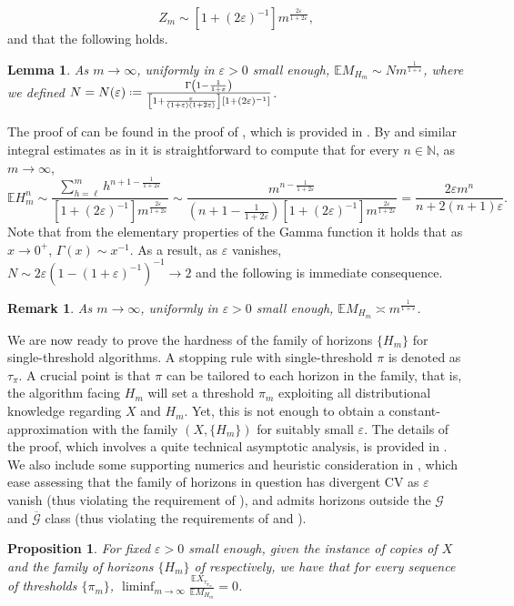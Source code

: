 \documentclass[11pt, a4paper, twoside]{article}
\newcommand*{\defeq}{\mathrel{\vcenter{\baselineskip0.5ex \lineskiplimit0pt
			\hbox{\scriptsize.}\hbox{\scriptsize.}}}=}
\newcommand{\eps}{\varepsilon}
\newcommand{\NN}{\mathbb{N}}
\newcommand{\EE}{\mathbb{E}}
\newcommand{\PGF}{\mathcal{G}}
\newcommand{\PGFd}{\overline{\mathcal{G}}}
\newtheorem{proposition}{Proposition}[section]
\newtheorem{lemma}{Lemma}[section]
\newtheorem{remark}{Remark}[section]
\numberwithin{equation}{section}
\begin{document}
	\begin{equation}\label{asympnorm}
		Z_m\sim [1+(2\eps)^{-1}]m^{\frac{2\eps}{1+2\eps}},
	\end{equation} 
	and that the following holds.
	\begin{lemma}\label{asympmax_H_m}
		As $m\longrightarrow\infty$, uniformly in $\eps>0$ small enough, $\EE M_{H_m}\sim N m^{\frac{1}{1+\eps}}$, where we defined
		$N=N(\eps)\defeq\frac{\Gamma\left(1-\frac{1}{1+\eps}\right)}{\left[1+\frac{\eps}{(1+\eps)(1+2\eps)}\right][1+(2\eps)^{-1}]}$.
	\end{lemma}
	The proof of  can be found in the proof of , which is provided in . By  and similar integral estimates as in  it is straightforward to compute that for every $n\in\NN$, as $m\longrightarrow\infty$,
	\begin{equation}\label{expectationn}
		\EE H_m^n\sim\frac{\sum_{h=\ell}^mh^{n+1-\frac{1}{1+2\eps}}}{[1+(2\eps)^{-1}]m^{\frac{2\eps}{1+2\eps}}}\sim\frac{m^{n-\frac{1}{1+2\eps}}}{\left(n+1-\frac{1}{1+2\eps}\right)[1+(2\eps)^{-1}]m^{\frac{2\eps}{1+2\eps}}}= \frac{2\eps m^n}{n+2(n+1)\eps}.
	\end{equation}
Note that from the elementary properties of the Gamma function it holds that as $x\longrightarrow 0^+$, $\Gamma(x)\sim x^{-1}$. As a result, as $\eps$ vanishes, $N\sim2\eps\left(1-(1+\eps)^{-1}\right)^{-1}\longrightarrow 2$ and the following is immediate consequence.
	\begin{remark}\label{asympmaxunif_H_m}
		As $m\longrightarrow\infty$, uniformly in $\eps>0$ small enough, $\EE M_{H_m}\asymp m^{\frac{1}{1+\eps}}$.
	\end{remark}
	
	We are now ready to prove the hardness of the family of horizons $\{H_m\}$ for single-threshold algorithms. A stopping rule with single-threshold $\pi$ is denoted as $\tau_\pi$. A crucial point is that $\pi$ can be tailored to each horizon in the family, that is, the algorithm facing $H_m$ will set a threshold $\pi_m$ exploiting all distributional knowledge regarding $X$ and $H_m$. Yet, this is not enough to obtain a constant-approximation with the family $(X,\{H_m\})$ for suitably small $\eps$. The details of the proof, which involves a quite technical asymptotic analysis, is provided in . We also include some supporting numerics and heuristic consideration in , which ease assessing that the family of horizons in question has divergent CV as $\eps$ vanish (thus violating the requirement of ), and admits horizons outside the $\PGF$ and $\PGFd$ class (thus violating the requirements of  and ).
	\begin{proposition}\label{hardsingle}
		For fixed $\eps>0$ small enough, given the instance of copies of $X$ and the family of horizons $\{H_m\}$ of  respectively, we have that for every sequence of thresholds $\{\pi_m\}$,  $\liminf_{m\longrightarrow\infty}\frac{\EE X_{\tau_{\pi_m}}}{\EE M_{H_m}}=0$.
	\end{proposition}
\end{document}
